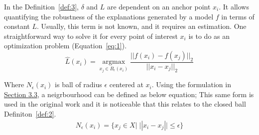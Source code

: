 \documentclass[english]{tktltiki2}
\theoremstyle{definition}
\newtheorem{definition}[thm]{Definition}
\theoremstyle{remark}
\begin{document}
In the Definition~\ref{def:3}, $\delta$ and $L$ are dependent on an anchor point $x_i$. It allows quantifying the robustness of the explanations generated by a model $f$ in terms of constant $L$. Usually, this term is not known, and it requires an estimation. One straightforward way to solve it for every point of interest $x_i$ is to do as an optimization problem (Equation~\ref{eq:1}).
\begin{equation}\label{eq:1}
\hat{L}(x_i) = \operatorname*{argmax}_{x_j \in B_{\epsilon}(x_i)}  \frac{||f(x_i) - f(x_j)||_{2}}{||x_i - x_j||_{2}}
\end{equation}

Where $N_{\epsilon}(x_{i})$ is ball of radius $\epsilon$ centered at $x_i$. Using the formulation in \hyperref[sec:defining_similarity]{Section 3.3}, a neigrbourhood can be defined as below equation; This same form is used in the original work \citep{alvarez2018robustness} and it is noticeable that this relates to the closed ball Definiton~\ref{def:2}.
\begin{align*}
N_{\epsilon}(x_i) = \{x_j \in X|\;||x_i - x_j|| \leq \epsilon\}
\end{align*}  

\end{document}
